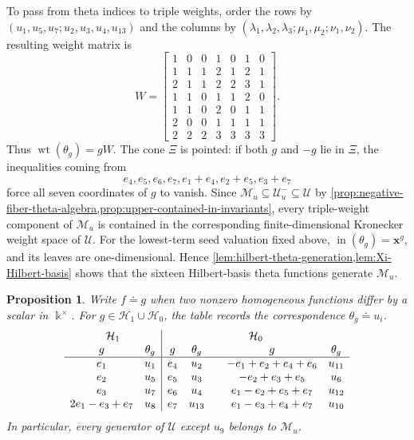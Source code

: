 \documentclass[11pt,reqno]{amsart}
\numberwithin{equation}{section}
\newtheorem{proposition}[proposition]{Proposition}
\theoremstyle{remark}
\newcommand{\kk}{\Bbbk}
\newcommand{\UR}{\mathscr U}
\newcommand{\Uneg}{\mathcal U_u^{-}}
\newcommand{\Mu}{\mathcal M_u}
\newcommand{\wt}{\operatorname{wt}}
\newcommand{\initer}{\operatorname{in}}
\begin{document}
To pass from theta indices to triple weights, order the rows by
$(u_1,u_5,u_7;u_2,u_3,u_4,u_{13})$ and the columns by
$(\lambda_1,\lambda_2,\lambda_3;\mu_1,\mu_2;\nu_1,\nu_2)$.  The
resulting weight matrix is
\begin{equation}
\label{eq:weight-matrix-W}
 W=
 \left[\begin{array}{ccc|cc|cc}
 1&0&0&1&0&1&0\\
 1&1&1&2&1&2&1\\
 2&1&1&2&2&3&1\\
 1&1&0&1&1&2&0\\
 1&1&0&2&0&1&1\\
 2&0&0&1&1&1&1\\
 2&2&2&3&3&3&3
 \end{array}\right].
\end{equation}
Thus $\wt(\theta_g)=gW$.  The cone $\Xi$ is pointed: if both
$g$ and $-g$ lie in $\Xi$, the inequalities coming from
\[ e_4,e_5,e_6,e_7,e_1+e_4,e_2+e_5,e_3+e_7 \]
force all seven coordinates of $g$ to vanish.  Since
$\Mu\subseteq\Uneg\subseteq\UR$ by
\cref{prop:negative-fiber-theta-algebra,prop:upper-contained-in-invariants},
every triple-weight component of $\Mu$ is contained in the corresponding
finite-dimensional Kronecker weight space of $\UR$.  For the lowest-term
seed valuation fixed above, $\initer(\theta_g)=\mathbf x^g$, and its leaves
are one-dimensional.  Hence
\cref{lem:hilbert-theta-generation,lem:Xi-Hilbert-basis} shows that the
sixteen Hilbert-basis theta functions generate $\Mu$.

\begin{proposition}
\label{prop:twelve-generators-in-middle}
Write $f\doteq g$ when two nonzero homogeneous functions differ by a
scalar in $\kk^\times$.  For $g\in\mathcal H_1\cup\mathcal H_0$, the
table records the correspondence $\theta_g\doteq u_i$.
\begingroup
\setlength{\arraycolsep}{3pt}
\renewcommand{\arraystretch}{1.12}
\begin{equation}
\label{eq:theta-generator-table}
\begin{array}{cc|cc@{\qquad}cc}
\multicolumn{2}{c|}{\mathcal H_1}
 &\multicolumn{4}{c}{\mathcal H_0}\\
 g&\theta_g&g&\theta_g&g&\theta_g\\ \hline
 e_1&u_1&e_4&u_2&-e_1+e_2+e_4+e_6&u_{11}\\
 e_2&u_5&e_5&u_3&-e_2+e_3+e_5&u_6\\
 e_3&u_7&e_6&u_4&e_1-e_2+e_5+e_7&u_{12}\\
 2e_1-e_3+e_7&u_8&e_7&u_{13}&e_1-e_3+e_4+e_7&u_{10}
\end{array}
\end{equation}
\endgroup
In particular, every generator of $\UR$ except $u_9$ belongs to
$\Mu$.
\end{proposition}
\end{document}
